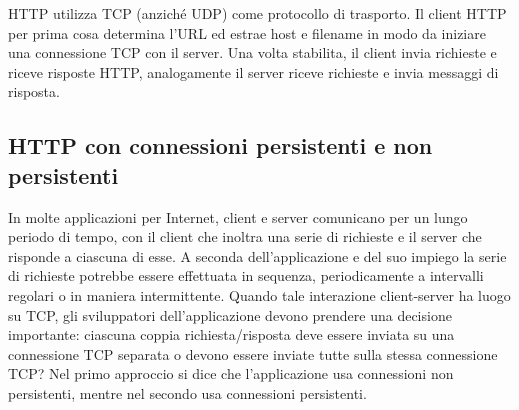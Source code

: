 HTTP utilizza TCP (anziché UDP) come protocollo di trasporto. Il client HTTP per prima cosa determina l'URL ed estrae host e filename in modo da iniziare una connessione TCP con il server. Una volta stabilita, il client invia richieste e riceve risposte HTTP, analogamente il server riceve richieste e invia messaggi di risposta.

\subsection{HTTP con connessioni persistenti e non persistenti}
In molte applicazioni per Internet, client e server comunicano per un lungo periodo di tempo, con il client che inoltra una serie di richieste e il server che risponde a ciascuna di esse. A seconda dell'applicazione e del suo impiego la serie di richieste potrebbe essere effettuata in sequenza, periodicamente a intervalli regolari o in maniera intermittente. Quando tale interazione client-server ha luogo su TCP, gli sviluppatori dell'applicazione devono prendere una decisione importante: ciascuna coppia richiesta/risposta deve essere inviata su una connessione TCP separata o devono essere inviate tutte sulla stessa connessione TCP? Nel primo approccio si dice che l'applicazione usa connessioni non persistenti, mentre nel secondo usa connessioni persistenti.

